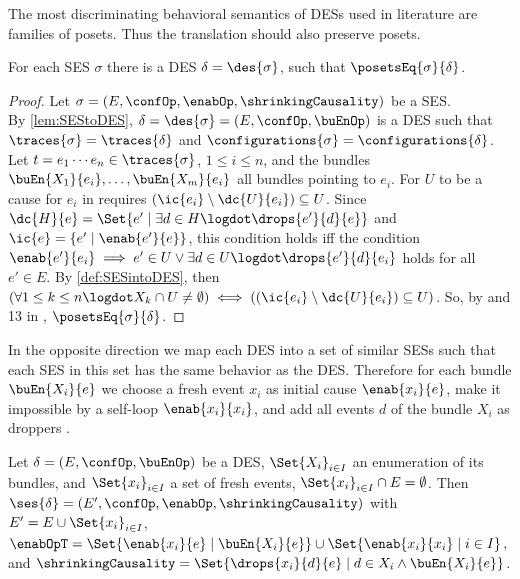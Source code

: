 \documentclass[runningheads,a4paper]{llncs}
\begin{document}
The most discriminating behavioral semantics of DESs used in literature are
families of posets. Thus the translation should also preserve posets.

\begin{theorem}
	\label{thm:SESintoDES}
	For each SES $ \sigma $ there is a DES $ \delta = \des{\sigma} $, such that $ \posetsEq {\sigma }{\delta} $.
\end{theorem}

\begin{proof}
	Let $ \sigma = \left( E, \confOp, \enabOp, \shrinkingCausality \right) $ be a SES.\\
	By \lem\ref{lem:SEStoDES}, $ \delta = \des{\sigma} = \left( E, \confOp, \buEnOp \right) $ is a DES such that $ \traces{\sigma} = \traces{\delta} $ and $ \configurations{\sigma} = \configurations{\delta} $.\\
	Let $ t = e_1 \cdots e_n \in \traces{\sigma} $, $ 1 \leq i \leq n $, and the bundles $ \buEn{X_1}{e_i}, \ldots, \buEn{X_m}{e_i} $ all bundles pointing to $ e_i $. For $ U $ to be a cause for $ e_i $  in \cite{dynamicCausality15} requires $ ( \ic{e_i} \setminus \dc{U}{e_i} ) \subseteq U $. Since $ \dc{H}{e} = \Set{ e' \mid \exists d \in H \logdot \drops{e'}{d}{e} } $ and $ \ic{e} = \{e'\mid\enab{e'}{e}\} $, this condition holds iff the condition $ \enab{e'}{e_i} \implies e' \in U \lor \exists d \in U \logdot \drops{e'}{d}{e_i} $ holds for all $ e' \in E $.
	By \ref{def:SESintoDES}, then $ ( \forall 1 \leq k \leq n \logdot X_k \cap U \neq \emptyset ) \iff ( ( \ic{e_i} \setminus \dc{U}{e_i} ) \subseteq U ) $.
	So, by  and 13 in \cite{dynamicCausality15}, $ \posetsEq {\sigma }{\delta}$.
\end{proof}

In the opposite direction we map each DES into a set of similar SESs such that each SES in this set has the same behavior as the DES. Therefore for each bundle $ \buEn{X_i}{e} $ we choose a fresh event $ x_i $ as initial cause $ \enab{x_i}{e} $, make it impossible by a self-loop $ \enab{x_i}{x_i} $, and add all events $ d $ of the bundle $ X_i $ as droppers .

\begin{definition}
	\label{def:DESintoSES}
	Let $ \delta = \left( E, \confOp, \buEnOp \right) $ be a DES, $ \Set{ X_i }_{i \in I} $ an enumeration of its bundles, and $ \Set{ x_i }_{i \in I} $ a set of fresh events, \ie $ \Set{ x_i }_{i \in I} \cap E = \emptyset $.
	Then $ \ses{\delta} = \left( E', \confOp, \enabOp, \shrinkingCausality \right) $ with $ E' = E \cup \Set{ x_i }_{i \in I} $, $ \enabOpT = \Set{ \enab{x_i}{e} \mid \buEn{X_i}{e} } \cup \Set{ \enab{x_i}{x_i} \mid i \in I } $, and $ \shrinkingCausality = \Set{ \drops{x_i}{d}{e} \mid d \in X_i \land \buEn{X_i}{e} } $.
\end{definition}
\end{document}
